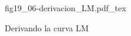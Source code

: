 \begin{figure}[h]
\centering
\def\svgwidth{0.9\textwidth}
{fig19_06-derivacion_LM.pdf_tex}
\caption{Derivando la curva LM}
\label{fig19_06-derivacion_LM}
\end{figure}